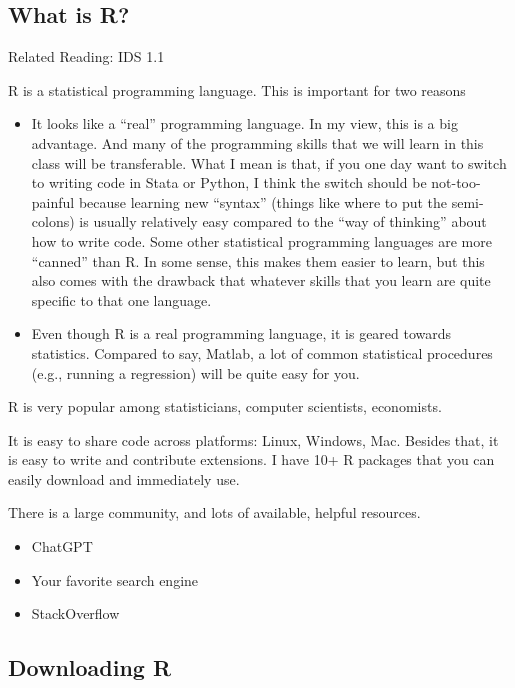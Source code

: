 \documentclass[
  letterpaper,
  DIV=11,
  numbers=noendperiod]{scrreprt}
\begin{document}
\subsection{What is R?}\label{what-is-r}

Related Reading: IDS 1.1

R is a statistical programming language. This is important for two
reasons

\begin{itemize}
\item
  It looks like a ``real'' programming language. In my view, this is a
  big advantage. And many of the programming skills that we will learn
  in this class will be transferable. What I mean is that, if you one
  day want to switch to writing code in Stata or Python, I think the
  switch should be not-too-painful because learning new ``syntax''
  (things like where to put the semi-colons) is usually relatively easy
  compared to the ``way of thinking'' about how to write code. Some
  other statistical programming languages are more ``canned'' than R. In
  some sense, this makes them easier to learn, but this also comes with
  the drawback that whatever skills that you learn are quite specific to
  that one language.
\item
  Even though R is a real programming language, it is geared towards
  statistics. Compared to say, Matlab, a lot of common statistical
  procedures (e.g., running a regression) will be quite easy for you.
\end{itemize}

R is very popular among statisticians, computer scientists, economists.

It is easy to share code across platforms: Linux, Windows, Mac. Besides
that, it is easy to write and contribute extensions. I have 10+ R
packages that you can easily download and immediately use.

There is a large community, and lots of available, helpful resources.

\begin{itemize}
\item
  ChatGPT
\item
  Your favorite search engine
\item
  StackOverflow
\end{itemize}

\subsection{Downloading R}\label{downloading-r}
\end{document}
